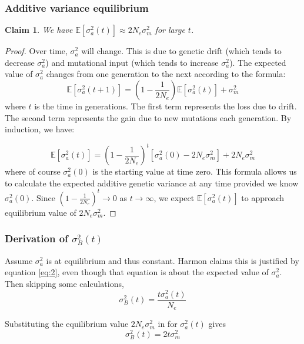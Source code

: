 \documentclass{article}
\newtheorem{claim}{Claim}
\newcommand{\1}[1]{\textbf{1}_{\left[#1\right]}} %
\def\E{\mathbb{E}} %
\def\[{\left [}
\def\]{\right ]}
\newcommand{\advar}{\sigma_{a}^{2}} %
\newcommand{\bvar}{\sigma_{B}^{2}}  %
\newcommand{\mvar}{\sigma_{m}^{2}}  %
\begin{document}
\subsubsection{Additive variance equilibrium}
\begin{claim}
  We have $\E\[ \advar (t)\] \approx 2N_{e}\sigma_{m}^{2}$ for large $t$.
\end{claim}
\begin{proof}
  Over time, $\advar$ will change. This is due to genetic drift (which tends to
  decrease $\advar$) and mutational input (which tends to increase $\advar$). The
  expected value of $\advar$ changes from one generation to the next according to
  the formula:
  \begin{equation*} \E\[\advar(t+1) \]= \left( 1-\frac{1}{2N_{e}}
    \right)\E\[\sigma_{a}^{2}(t) \]+\sigma_{m}^{2}
  \end{equation*}
  where $t$ is the time in generations. The first term represents the loss due to
  drift. The second term represents the gain due to new mutations each generation.
  By induction, we have:

  \begin{equation}\label{eq:2}
    \E\[\advar(t) \] = \left( 1-\frac{1}{2N_{e}} \right)^{t}\left[ \advar(0) -2N_{e}\mvar \right] + 2N_{e}\mvar 
  \end{equation}
  where of course $\advar(0)$ is the starting value at time zero. This formula
  allows us to calculate the expected additive genetic variance at any time
  provided we know $\advar(0)$. Since $\left( 1-\frac{1}{2N_{e}} \right)^{t}\to 0$
  as $t\to\infty$, we expect $\E\[ \advar (t) \]$ to approach equilibrium value of
  $2N_{e}\sigma_{m}^{2}$.
\end{proof}


\subsubsection{Derivation of $\bvar(t)$}
  

Assume $\advar$ is at equilibrium and thus constant. Harmon claims this is
justified by equation \eqref{eq:2}, even though that equation is about the
expected value of $\advar$. Then skipping some calculations,
\begin{equation}
  \label{eq:1}
  \bvar(t)= \frac{t\advar(t)}{N_{e}}
\end{equation}

Substituting the equilibrium value $2N_{e}\mvar$ in for $\advar(t)$ gives
\begin{equation}
  \label{eq:4}
  \bvar(t) = 2t \mvar
\end{equation}
\end{document}
